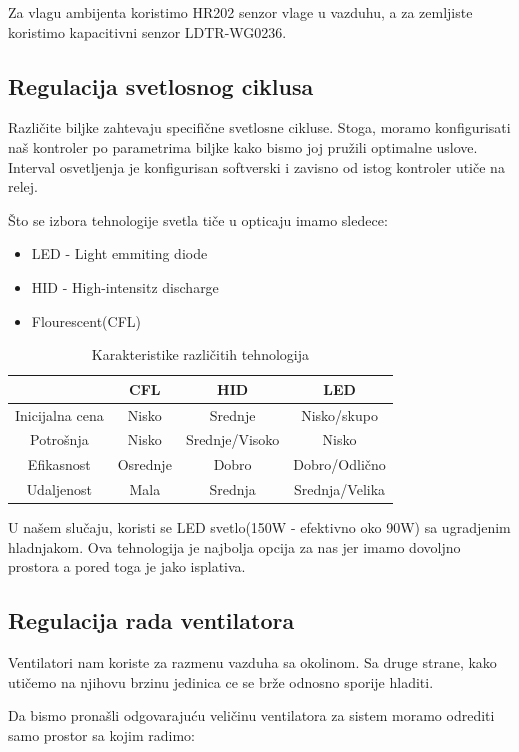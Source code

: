 \documentclass[a4paper,11pt]{book}
\begin{document}
Za vlagu ambijenta koristimo HR202 senzor vlage u vazduhu, a za zemljiste koristimo kapacitivni senzor LDTR-WG0236.

\subsection{Regulacija svetlosnog ciklusa}
Različite biljke zahtevaju specifične svetlosne cikluse. Stoga, moramo konfigurisati naš kontroler po parametrima biljke kako bismo joj pružili optimalne uslove. Interval osvetljenja je konfigurisan softverski i zavisno od istog kontroler utiče na relej. 

Što se izbora tehnologije svetla tiče u opticaju imamo sledece:

\hrulefill
\begin{itemize}
  \item LED - Light emmiting diode
  \item HID - High-intensitz discharge
  \item Flourescent(CFL)
\end{itemize}
\hrulefill

\begin{table}[ht]
  \caption{Karakteristike različitih tehnologija}
  \begin{tabular}{|c|c|c|c|}
  \hline
   & CFL & HID & LED \\ \hline
  Inicijalna cena & Nisko & Srednje & Nisko/skupo \\ \hline
  Potrošnja & Nisko & Srednje/Visoko & Nisko \\ \hline
  Efikasnost & Osrednje & Dobro & Dobro/Odlično \\ \hline
  Udaljenost & Mala & Srednja & Srednja/Velika \\ \hline
  \end{tabular}
\end{table}

U našem slučaju, koristi se LED svetlo(150W - efektivno oko 90W) sa ugradjenim hladnjakom. Ova tehnologija je najbolja opcija za nas jer imamo dovoljno prostora a pored toga je jako isplativa.

\subsection{Regulacija rada ventilatora}
Ventilatori nam koriste za razmenu vazduha sa okolinom. Sa druge strane, kako utičemo na njihovu brzinu jedinica ce se brže odnosno sporije hladiti.

Da bismo pronašli odgovarajuću veličinu ventilatora za sistem moramo odrediti samo prostor sa kojim radimo:
\end{document}
